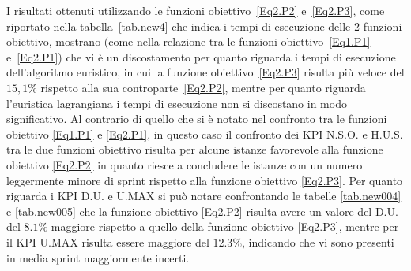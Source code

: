 \documentclass[12pt,a4paper,openright,twoside]{book}
\begin{document}
I risultati ottenuti utilizzando le funzioni obiettivo~\eqref{Eq2.P2} e~\eqref{Eq2.P3}, come riportato nella tabella~\ref{tab.new4} che indica i tempi di esecuzione delle 2 funzioni obiettivo, mostrano (come nella relazione tra le funzioni obiettivo~\eqref{Eq1.P1} e~\eqref{Eq2.P1}) che vi è un discostamento per quanto riguarda i tempi di esecuzione dell'algoritmo euristico, in cui la funzione obiettivo~\eqref{Eq2.P3} risulta più veloce del $15{,}1\%$ rispetto alla sua controparte~\eqref{Eq2.P2}, mentre per quanto riguarda l'euristica lagrangiana i tempi di esecuzione non si discostano in modo significativo.
Al contrario di quello che si \`e notato nel confronto tra le funzioni obiettivo \eqref{Eq1.P1} e \eqref{Eq2.P1}, in questo caso il confronto dei KPI N.S.O. e H.U.S. tra le due funzioni obiettivo risulta per alcune istanze favorevole alla funzione obiettivo \eqref{Eq2.P2} in quanto riesce a concludere le istanze con un numero leggermente minore di sprint rispetto alla funzione obiettivo \eqref{Eq2.P3}.
Per quanto riguarda i KPI D.U. e U.MAX si può notare confrontando le tabelle \ref{tab.new004} e \ref{tab.new005} che la funzione obiettivo \eqref{Eq2.P2} risulta avere un valore del D.U. del $ 8.1\%$ maggiore rispetto a quello della funzione obiettivo \eqref{Eq2.P3}, mentre per il KPI U.MAX risulta essere maggiore del $ 12.3\%$, indicando che vi sono presenti in media sprint maggiormente incerti. 
\end{document}
